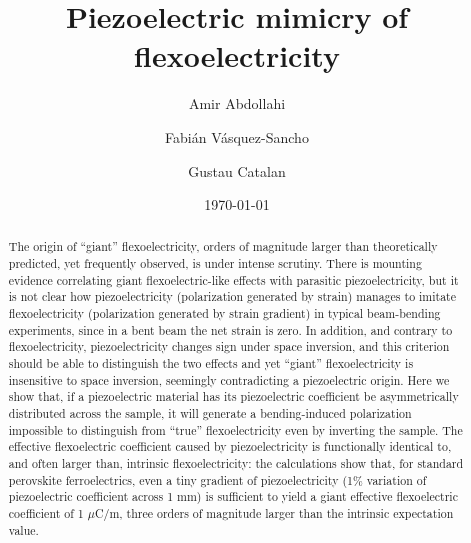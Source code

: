 \documentclass[%
 aps,prl,showpacs,
 amsmath,amssymb,
 reprint,%
]{revtex4-1}
\begin{document}

\title{Piezoelectric mimicry of flexoelectricity}%

\author{Amir Abdollahi}
%

\author{Fabi\'an V\'asquez-Sancho }

%

\author{Gustau Catalan}
%
%




\date{\today}%

             
\begin{abstract}
The origin of ``giant'' flexoelectricity, orders of magnitude larger than theoretically predicted, yet frequently observed,
is under intense scrutiny. There is mounting evidence correlating giant flexoelectric-like
effects with parasitic piezoelectricity, but it is not clear how piezoelectricity (polarization generated by strain) 
manages to imitate flexoelectricity (polarization generated by strain gradient) in typical beam-bending experiments, since in a bent beam the net strain
is zero. In addition, and contrary to flexoelectricity, piezoelectricity changes sign under space inversion, 
and this criterion should be able to distinguish the two effects and yet ``giant'' flexoelectricity is insensitive to space inversion, seemingly contradicting a piezoelectric origin. Here we show that, if a piezoelectric material has
its piezoelectric coefficient be asymmetrically distributed across the sample, it will generate a bending-induced 
polarization impossible to distinguish from “true” flexoelectricity even by inverting the sample. The effective
flexoelectric coefficient caused by piezoelectricity is functionally identical to, and often larger than, intrinsic
flexoelectricity: the calculations show that, for standard perovskite ferroelectrics, even a tiny gradient of piezoelectricity
(1\% variation of piezoelectric coefficient across 1 mm) 
is sufficient to yield a giant effective flexoelectric coefficient
of 1 $\mu$C/m, three orders of magnitude larger than the intrinsic expectation value.



\end{abstract}
\end{document}
